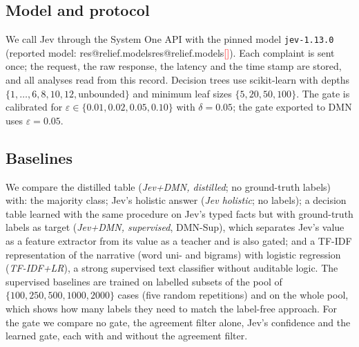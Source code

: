 \documentclass[a4paper,fleqn]{cas-sc}
\makeatletter
\theoremstyle{definition}
\newcommand{\tbd}[1]{\textcolor{red}{[\detokenize{#1}]}}
\newcommand{\res}[1]{\ifcsname res@#1\endcsname\csname res@#1\endcsname\else\tbd{#1}\fi}
\newcommand{\jev}{Jev}
\makeatother
\begin{document}
\subsection{Model and protocol}
We call \jev{} through the System One API with the pinned model \texttt{jev-1.13.0} (reported model: \res{relief.models}). Each complaint is sent once; the request, the raw response, the latency and the time stamp are stored, and all analyses read from this record. Decision trees use scikit-learn \citep{pedregosa2011} with depths $\{1,\dots,6,8,10,12,\text{unbounded}\}$ and minimum leaf sizes $\{5,20,50,100\}$. The gate is calibrated for $\varepsilon\in\{0.01,0.02,0.05,0.10\}$ with $\delta=0.05$; the gate exported to DMN uses $\varepsilon=0.05$.

\subsection{Baselines}
We compare the distilled table (\emph{Jev+DMN, distilled}; no ground-truth labels) with: the majority class; \jev{}'s holistic answer (\emph{Jev holistic}; no labels); a decision table learned with the same procedure on \jev{}'s typed facts but with ground-truth labels as target (\emph{Jev+DMN, supervised}, DMN-Sup), which separates \jev{}'s value as a feature extractor from its value as a teacher and is also gated; and a TF-IDF representation of the narrative (word uni- and bigrams) with logistic regression (\emph{TF-IDF+LR}), a strong supervised text classifier without auditable logic. The supervised baselines are trained on labelled subsets of the pool of $\{100, 250, 500, 1000, 2000\}$ cases (five random repetitions) and on the whole pool, which shows how many labels they need to match the label-free approach. For the gate we compare no gate, the agreement filter alone, \jev{}'s confidence and the learned gate, each with and without the agreement filter.
\end{document}
